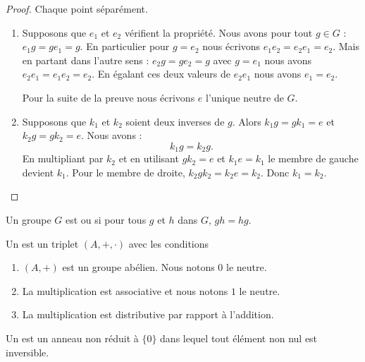 \begin{proof}
    Chaque point séparément.
    \begin{enumerate}
        \item
            Supposons que \( e_1\) et \( e_2\) vérifient la propriété. Nous avons pour tout \( g\in G\) : \( e_1g=ge_1=g\). En particulier pour \( g=e_2\) nous écrivons \( e_1e_2=e_2e_1=e_2\). Mais en partant dans l'autre sens : \( e_2g=ge_2=g\) avec \( g=e_1\) nous avons \( e_2e_1=e_1e_2=e_2\). En égalant ces deux valeurs de \( e_2e_1\) nous avons \( e_1=e_2\).

            Pour la suite de la preuve nous écrivons \( e\) l'unique neutre de \( G\).

        \item
            Supposons que \( k_1\) et \( k_2\) soient deux inverses de \( g\). Alors \( k_1g=gk_1=e\) et \( k_2g=gk_2=e\). Nous avons :
            \begin{equation}
                k_1g=k_2g.
            \end{equation}
            En multipliant par \( k_2\) et en utilisant \( gk_2=e\) et \( k_1e=k_1\) le membre de gauche devient \( k_1\). Pour le membre de droite, \( k_2gk_2=k_2e=k_2\). Donc \( k_1=k_2\).
    \end{enumerate}
\end{proof}

\begin{definition}
    Un groupe \( G\) est  ou  si pour tous \( g\) et \( h\) dans \( G\), \( gh=hg\).
\end{definition}

\begin{definition}     \label{DefHXJUooKoovob}
    Un  est un triplet \( (A,+,\cdot)\) avec les conditions
    \begin{enumerate}
        \item
            \( (A,+)\) est un groupe abélien. Nous notons \( 0\) le neutre.
        \item
            La multiplication est associative et nous notons \( 1\) le neutre.
        \item
            La multiplication est distributive par rapport à l'addition.
    \end{enumerate}
\end{definition}

\begin{definition}  \label{DefTMNooKXHUd}
    Un  est un anneau non réduit à \( \{ 0 \}\) dans lequel tout élément non nul est inversible.
\end{definition}

